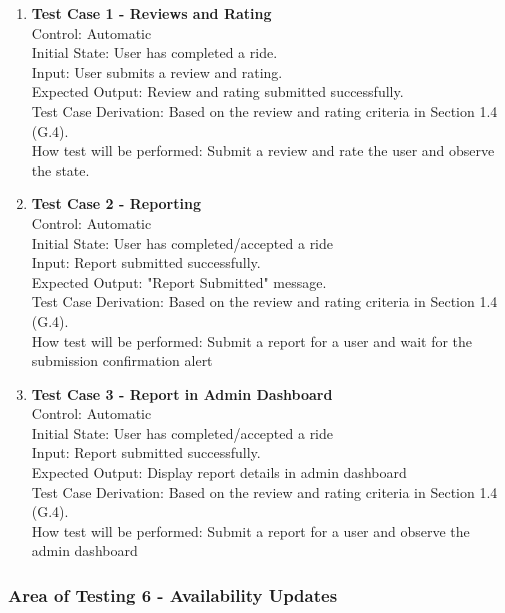 \documentclass[12pt, titlepage]{article}
\begin{document}
\begin{enumerate}
\item \textbf{Test Case 1 - Reviews and Rating}\\
Control: Automatic\\
Initial State: User has completed a ride.\\
Input: User submits a review and rating.\\
Expected Output: Review and rating submitted successfully.\\
Test Case Derivation: Based on the review and rating criteria in Section 1.4 (G.4).\\
How test will be performed: Submit a review and rate the user and observe the state.\\

\item \textbf{Test Case 2 - Reporting}\\
Control: Automatic\\
Initial State: User has completed/accepted a ride\\
Input: Report submitted successfully.\\
Expected Output: "Report Submitted" message.\\
Test Case Derivation: Based on the review and rating criteria in Section 1.4 (G.4).\\
How test will be performed: Submit a report for a user and wait for the submission confirmation alert\\

\item \textbf{Test Case 3 - Report in Admin Dashboard}\\
Control: Automatic\\
Initial State: User has completed/accepted a ride\\
Input: Report submitted successfully.\\
Expected Output: Display report details in admin dashboard\\
Test Case Derivation: Based on the review and rating criteria in Section 1.4 (G.4).\\
How test will be performed: Submit a report for a user and observe the admin dashboard\\

\end{enumerate}

\subsubsection{Area of Testing 6 - Availability Updates}
\end{document}
